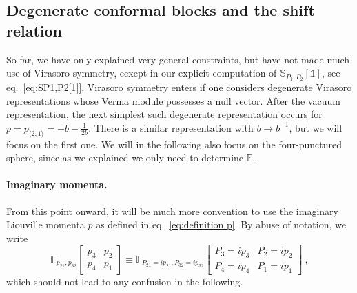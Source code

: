 \documentclass[12pt,a4paper]{article}
\newcommand{\be}{\begin{equation}}
\newcommand{\ee}{\end{equation}}
\newcommand\id{\mathds{1}}
\begin{document}
\subsection{Degenerate conformal blocks and the shift relation} \label{subsec:degenerate conformal blocks}
So far, we have only explained very general constraints, but have not made much use of Virasoro symmetry, ecxept in our explicit computation of $\mathbb{S}_{P_1,P_2}[\id]$, see eq.~\eqref{eq:SP1,P2[1]}. Virasoro symmetry enters if one considers degenerate Virasoro representations whose Verma module possesses a null vector. After the vacuum representation, the next simplest such degenerate representation occurs for $p=p_{\langle 2,1 \rangle}=-b-\frac{1}{2b}$. There is a similar representation with $b \to b^{-1}$, but we will focus on the first one. We will in the following also focus on the four-punctured sphere, since as we explained we only need to determine $\mathbb{F}$.
\paragraph{Imaginary momenta.} From this point onward, it will be much more convention to use the imaginary Liouville momenta $p$ as defined in eq.~\eqref{eq:definition p}. By abuse of notation, we write
\be 
\mathbb{F}_{p_{21},p_{32}}\!\begin{bmatrix}
    p_3 & p_2 \\ p_4 & p_1
\end{bmatrix} \equiv \mathbb{F}_{P_{21}=i p_{21},P_{32}=i p_{32}}\!\begin{bmatrix}
    P_3=i p_3 & P_2=i p_2 \\ P_4=i p_4 & P_1=i p_1
\end{bmatrix}\ ,
\ee
which should not lead to any confusion in the following.
\end{document}
